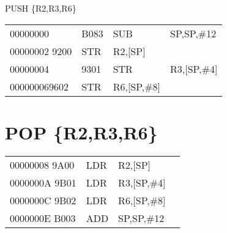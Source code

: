 PUSH \{R2,R3,R6\}

\begin{center}
\begin{tabular}{llll}
00000000 & B083 & SUB & SP,SP,\#12 \\
00000002 9200 & STR & R2,[SP] &  \\
00000004 & 9301 & STR & R3,[SP,\#4] \\
000000069602 & STR & R6,[SP,\#8] &  \\
\end{tabular}
\end{center}

\section*{POP \{R2,R3,R6\}}
\begin{center}
\begin{tabular}{|llll|}
\hline
00000008 9A00 & LDR & R2,[SP] \\
0000000A 9B01 & LDR & R3,[SP,\#4] \\
0000000C 9B02 & LDR & R6,[SP,\#8] \\
0000000E B003 & ADD & SP,SP,\#12 \\
\hline
\end{tabular}
\end{center}